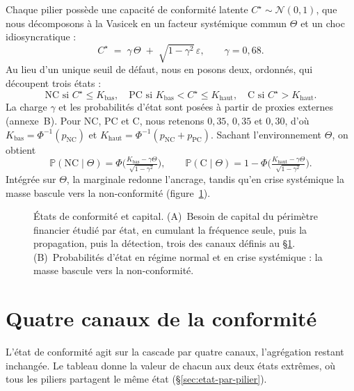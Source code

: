 Chaque pilier possède une capacité de conformité latente $C^\star\sim\mathcal N(0,1)$, que nous
décomposons à la Vasicek en un facteur systémique commun $\Theta$ et un choc idiosyncratique :
\begin{equation}
C^\star \;=\; \gamma\,\Theta \;+\; \sqrt{1-\gamma^2}\,\varepsilon, \qquad \gamma=0{,}68.
\end{equation}
Au lieu d'un unique seuil de défaut, nous en posons deux, ordonnés, qui découpent trois
états :
\begin{equation}
\text{NC si } C^\star\le K_{\text{bas}}, \quad
\text{PC si } K_{\text{bas}}<C^\star\le K_{\text{haut}}, \quad
\text{C si } C^\star>K_{\text{haut}}.
\end{equation}
La charge $\gamma$ et les probabilités d'état sont posées à partir de proxies externes
(annexe~B). Pour NC, PC et C, nous retenons $0{,}35$, $0{,}35$ et $0{,}30$, d'où $K_{\text{bas}}=\Phi^{-1}(p_{\text{NC}})$ et
$K_{\text{haut}}=\Phi^{-1}(p_{\text{NC}}+p_{\text{PC}})$. Sachant l'environnement $\Theta$, on
obtient
\begin{equation}
\mathbb P(\text{NC}\mid\Theta)=\Phi\!\Big(\tfrac{K_{\text{bas}}-\gamma\Theta}{\sqrt{1-\gamma^2}}\Big),
\qquad
\mathbb P(\text{C}\mid\Theta)=1-\Phi\!\Big(\tfrac{K_{\text{haut}}-\gamma\Theta}{\sqrt{1-\gamma^2}}\Big).
\end{equation}
Intégrée sur $\Theta$, la marginale redonne l'ancrage, tandis qu'en crise systémique la masse bascule
vers la non-conformité (figure~\ref{fig:multietats-rapport}).

\begin{figure}[H]\centering
{}
\caption{États de conformité et capital. (A)~Besoin de capital du périmètre financier étudié par état, en cumulant la fréquence seule,
puis la propagation, puis la détection, trois des canaux définis au
\S\ref{sec:quatre-canaux}. (B)~Probabilités d'état en régime normal et en crise systémique : la
masse bascule vers la non-conformité.}
\label{fig:multietats-rapport}
\end{figure}



\section{Quatre canaux de la conformité}
\label{sec:quatre-canaux}

L'état de conformité agit sur la cascade par quatre canaux, l'agrégation restant inchangée. Le
tableau donne la valeur de chacun aux deux états extrêmes, où tous les piliers partagent le même état
(\S\ref{sec:etat-par-pilier}).

